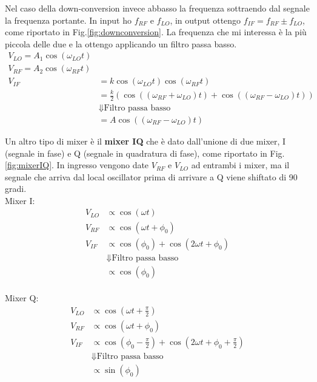 \documentclass{article}
\begin{document}
Nel caso della down-conversion invece abbasso la frequenza sottraendo dal segnale la frequenza portante.
In input ho $f_{RF}$ e $f_{LO}$, in output ottengo $f_{IF} = f_{RF} \pm f_{LO}$, come riportato in Fig.\ref{fig:downconversion}. 
La frequenza che mi interessa è la più piccola delle due e la ottengo applicando un filtro passa basso.
\begin{align*}
    V_{LO} = A_1 \cos(\omega_{LO}t)\\
    V_{RF} = A_2 \cos(\omega_{RF}t)\\
    V_{IF} &= k \cos(\omega_{LO}t) \cos(\omega_{RF}t) \\
           &= \frac{k}{2} (\cos((\omega_{RF}+\omega_{LO})t) + \cos((\omega_{RF}-\omega_{LO})t) )\\
           &\Downarrow \textrm{Filtro passa basso}\\
           &=A \cos((\omega_{RF}-\omega_{LO})t)
\end{align*}

Un altro tipo di mixer è il \textbf{mixer IQ} che è dato dall'unione di due mixer, I (segnale in fase) e Q (segnale in quadratura di fase), come riportato in Fig.\ref{fig:mixerIQ}.
In ingresso vengono date $V_{RF}$ e $V_{LO}$ ad entrambi i mixer, ma il segnale che arriva dal local oscillator prima di arrivare a Q viene shiftato di 90 gradi.
\\
Mixer I:
\begin{align*}
    V_{LO} &\propto \cos(\omega t)\\
    V_{RF} &\propto \cos(\omega t + \phi_0)\\
    V_{IF} &\propto \cos(\phi_0) + \cos(2 \omega t + \phi_0) \\
           &\Downarrow \textrm{Filtro passa basso}\\
           &\propto \cos(\phi_0)
\end{align*}
\\
Mixer Q:
\begin{align*}
    V_{LO} &\propto \cos(\omega t + \frac{\pi}{2})\\
    V_{RF} &\propto \cos(\omega t + \phi_0)\\
    V_{IF} &\propto \cos(\phi_0 - \frac{\pi}{2}) + \cos(2 \omega t + \phi_0 + \frac{\pi}{2}) \\
           &\Downarrow \textrm{Filtro passa basso}\\
           &\propto \sin(\phi_0)
\end{align*}
\end{document}

